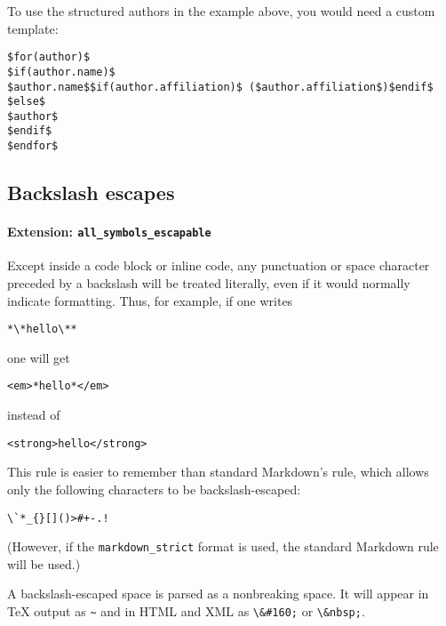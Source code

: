 \documentclass[]{article}
\let\oldparagraph\paragraph
\renewcommand{\paragraph}[1]{\oldparagraph{#1}\mbox{}}
\begin{document}
To use the structured authors in the example above, you would need a
custom template:

\begin{verbatim}
$for(author)$
$if(author.name)$
$author.name$$if(author.affiliation)$ ($author.affiliation$)$endif$
$else$
$author$
$endif$
$endfor$
\end{verbatim}

\subsection{Backslash escapes}\label{backslash-escapes}

\paragraph{\texorpdfstring{Extension:
\texttt{all\_symbols\_escapable}}{Extension: all\_symbols\_escapable}}\label{extension-all_symbols_escapable}

Except inside a code block or inline code, any punctuation or space
character preceded by a backslash will be treated literally, even if it
would normally indicate formatting. Thus, for example, if one writes

\begin{verbatim}
*\*hello\**
\end{verbatim}

one will get

\begin{verbatim}
<em>*hello*</em>
\end{verbatim}

instead of

\begin{verbatim}
<strong>hello</strong>
\end{verbatim}

This rule is easier to remember than standard Markdown's rule, which
allows only the following characters to be backslash-escaped:

\begin{verbatim}
\`*_{}[]()>#+-.!
\end{verbatim}

(However, if the \texttt{markdown\_strict} format is used, the standard
Markdown rule will be used.)

A backslash-escaped space is parsed as a nonbreaking space. It will
appear in TeX output as \texttt{\textasciitilde{}} and in HTML and XML
as \texttt{\textbackslash{}\&\#160;} or
\texttt{\textbackslash{}\&nbsp;}.
\end{document}
